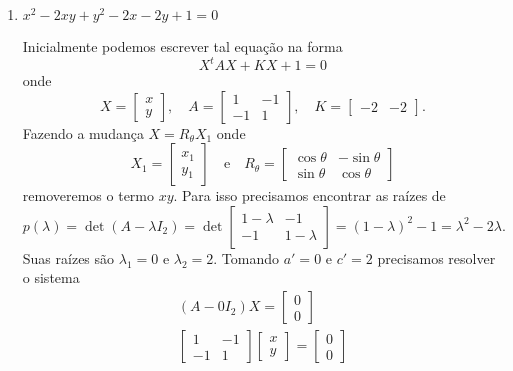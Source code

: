 \begin{exemplos}
\begin{enumerate}
    \item $x^2 - 2xy + y^2 - 2x - 2y + 1 = 0$
    \begin{solucao}
      Inicialmente podemos escrever tal equação na forma
      \[
        X^t A X + KX + 1 = 0
      \]
      onde
      \[
        X = \begin{bmatrix}
          x\\y
        \end{bmatrix}, \quad A = \begin{bmatrix}
          1 & -1\\
          -1 & 1
        \end{bmatrix},\quad K = \begin{bmatrix}
          -2 & -2
        \end{bmatrix}.
      \]
      Fazendo a mudança $X = R_\theta X_1$ onde
      \[
        X_1 = \begin{bmatrix}
          x_1 \\y_1
        \end{bmatrix} \quad\mbox{e}\quad R_\theta = \begin{bmatrix}
          \cos\theta & -\sin\theta\\
          \sin\theta & \cos\theta
        \end{bmatrix}
      \]
      removeremos o termo $xy$. Para isso precisamos encontrar as raízes de
      \[
        p(\lambda) = \det (A - \lambda I_2) = \det \begin{bmatrix}
          1 - \lambda & -1\\
          -1 & 1 - \lambda
        \end{bmatrix} = (1 - \lambda)^2 - 1 = \lambda^2 - 2\lambda.
      \]
      Suas raízes são $\lambda_1 = 0$ e $\lambda_2 = 2$. Tomando $a' = 0$ e $c' = 2$ precisamos resolver o sistema
      \begin{align*}
        (A - 0I_2)X = \begin{bmatrix}
          0\\0
        \end{bmatrix}\\
        \begin{bmatrix}
          1 & -1\\
          -1 & 1
        \end{bmatrix} \begin{bmatrix}
          x \\y
        \end{bmatrix} = \begin{bmatrix}
          0 \\0

\end{bmatrix}
\end{align*}
\end{solucao}
\end{enumerate}
\end{exemplos}
